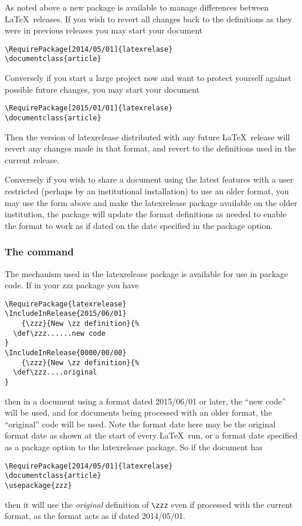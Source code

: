 \documentclass{ltnews}
\begin{document}
As noted above a new package is available to manage differences between \LaTeX\
releases. If you wish to revert all changes back to the definitions as they
were in previous releases you may start your document
\begin{verbatim}
\RequirePackage[2014/05/01]{latexrelase}
\documentclass{article}
\end{verbatim}
Conversely if you start a large project now and want to protect yourself
against possible future changes, you may start your document
\begin{verbatim}
\RequirePackage[2015/01/01]{latexrelase}
\documentclass{article}
\end{verbatim}
Then the version of \textsf{latexrelease} distributed with any future \LaTeX\
release will revert any changes made in that format, and revert to the
definitions used in the current release.

Conversely if you wish to share a document using the latest features with a
user restricted (perhaps by an institutional installation) to use an older
format, you may use the form above and make the \textsf{latexrelease} package
available on the older institution, the package will update the format
definitions as needed to enable the format to work as if dated on the date
specified in the package option.

\subsubsection{The  command}

The mechanism used in the \textsf{latexrelease} package is available for use in
package code. If in your \textsf{zzz} package you have
\begin{verbatim}
\RequirePackage{latexrelease}
\IncludeInRelease{2015/06/01}
    {\zzz}{New \zz definition}{%
  \def\zzz......new code
}
\IncludeInRelease{0000/00/00}
    {\zzz}{New \zz definition}{%
  \def\zzz....original
}
\end{verbatim}
then in a document using a format dated 2015/06/01 or later, the ``new code''
will be used, and for documents being processed with an older format, the
``original'' code will be used. Note the format date here may be the original
format date as shown at the start of every \LaTeX\ run, or a format date
specified as a package option to the \textsf{latexrelease} package. So if the
document has
\begin{verbatim}
\RequirePackage[2014/05/01]{latexrelase}
\documentclass{article}
\usepackage{zzz}
\end{verbatim}
then it will use the \emph{original} definition of \verb|\zzz| even if
processed with the current format, as the format acts as if dated 2014/05/01.
\end{document}
